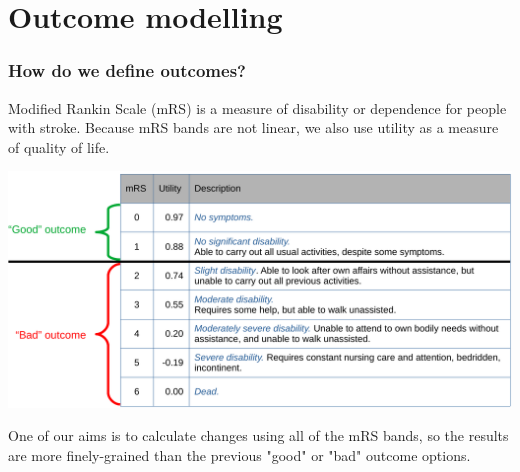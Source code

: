 \documentclass[xcolor={usenames,dvipsnames}]{beamer}
\begin{document}
\section{Outcome modelling}



\begin{frame}
\frametitle{How do we define outcomes?}

\footnotesize{Modified Rankin Scale (mRS) is a measure of disability or dependence for people with stroke.
Because mRS bands are not linear, we also use utility as a measure of quality of life.}

\begin{center} 
\includegraphics[width=1.0\textwidth]{./images/mRS_table}
\end{center} 


\footnotesize{One of our aims is to calculate changes using all of the mRS bands, so the results are more finely-grained than the previous "good" or "bad" outcome options.}

\end{frame}


\end{document}
